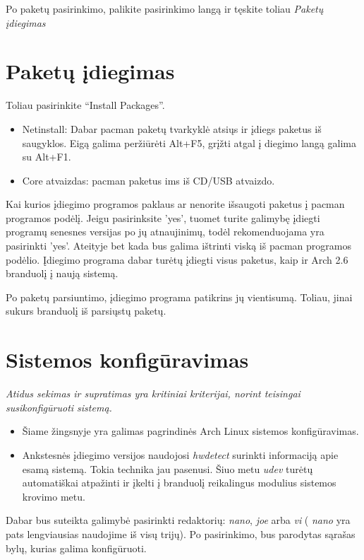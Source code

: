 Po paketų pasirinkimo, palikite pasirinkimo langą ir tęskite toliau
\textsl{Paketų įdiegimas}

\section{Paketų įdiegimas}

Toliau pasirinkite ``Install Packages''.

\begin{itemize}
  \item Netinstall: Dabar pacman paketų tvarkyklė atsiųs ir įdiegs
    paketus iš saugyklos. Eigą galima peržiūrėti Alt+F5, grįžti atgal į
    diegimo langą galima su Alt+F1.
  \item Core atvaizdas: pacman paketus ims iš CD/USB atvaizdo. 
\end{itemize}

Kai kurios įdiegimo programos paklaus ar nenorite išsaugoti paketus į
pacman programos podėlį. Jeigu pasirinksite 'yes', tuomet turite
galimybę įdiegti programų senesnes versijas po jų atnaujinimų, todėl
rekomenduojama yra pasirinkti 'yes'. Ateityje bet kada bus galima
ištrinti viską iš pacman programos podėlio. Įdiegimo programa dabar
turėtų įdiegti visus paketus, kaip ir Arch 2.6 branduolį į naują
sistemą.

Po paketų parsiuntimo, įdiegimo programa patikrins jų
vientisumą. Toliau, jinai sukurs branduolį iš parsiųstų paketų.

\section{Sistemos konfigūravimas}

\textsl{Atidus sekimas ir supratimas yra kritiniai kriterijai, norint
  teisingai susikonfigūruoti sistemą.}

\begin{itemize}
  \item Šiame žingsnyje yra galimas pagrindinės Arch Linux sistemos
    konfigūravimas.
  \item Ankstesnės įdiegimo versijos naudojosi \textsl{hwdetect}
    surinkti informaciją apie esamą sistemą. Tokia technika jau
    pasenusi. Šiuo metu \textsl{udev} turėtų automatiškai atpažinti ir
    įkelti į branduolį reikalingus modulius sistemos krovimo metu.
\end{itemize}

Dabar bus suteikta galimybė pasirinkti redaktorių: \textsl{nano},
\textsl{joe} arba \textsl{vi} ( \textsl{nano} yra pats lengviausias
naudojime iš visų trijų). Po pasirinkimo, bus parodytas sąrašas bylų,
kurias galima konfigūruoti.


